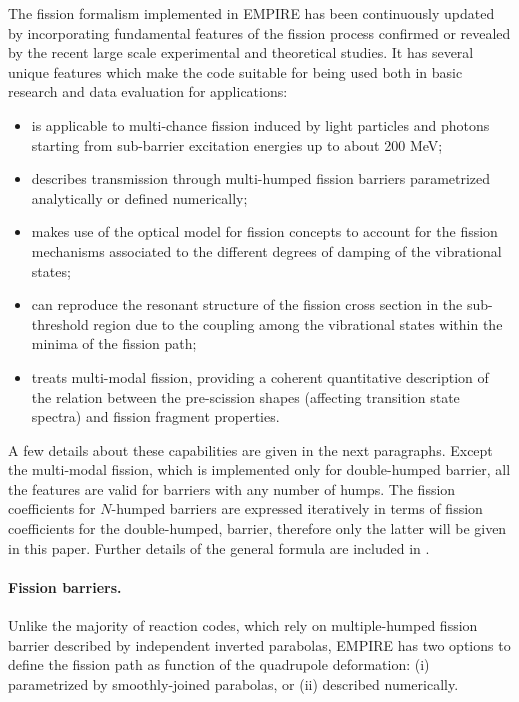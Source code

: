 \documentclass[twocolumn,amsmath,amssymb,10pt,groupedaddress,letter]{revtex4}
\begin{document}
The fission formalism implemented in EMPIRE has been continuously updated by incorporating
fundamental features of the fission process confirmed or revealed by the recent large scale
experimental and theoretical studies. It has several unique
features which make the code suitable for being used both in basic research and data
evaluation for applications:
\begin{itemize}
  \item is applicable to multi-chance  fission induced by light particles and photons
starting from sub-barrier excitation energies up to  about 200 MeV;
  \item describes transmission through multi-humped fission barriers parametrized analytically
or defined numerically;
  \item makes use of the optical model for fission concepts to account for the fission
mechanisms associated to the different degrees of damping of the vibrational states;
  \item can reproduce the resonant structure of the fission cross section in the
sub-threshold region due to the coupling among the vibrational states within the minima of
the fission path;
  \item treats multi-modal fission, providing a coherent
quantitative description of the relation between the pre-scission shapes (affecting
transition state spectra) and fission fragment properties.
\end{itemize}
A few details about these capabilities are given in the next paragraphs. Except the
multi-modal fission, which is implemented only for double-humped barrier, all the features
are valid for barriers with any number of humps. The fission coefficients for $N$-humped
barriers are expressed iteratively in terms of fission coefficients for the double-humped,
barrier, therefore only the latter will be given in this paper. Further details of the
general formula are included in \cite{Sin:07}.
\\

\medskip
\paragraph*{Fission barriers.}
Unlike the majority of reaction codes, which rely on multiple-humped fission
barrier described by independent inverted parabolas, EMPIRE has two options
to define the fission path as function of the quadrupole deformation:
(i) parametrized by smoothly-joined parabolas, or
(ii) described numerically.
\end{document}
